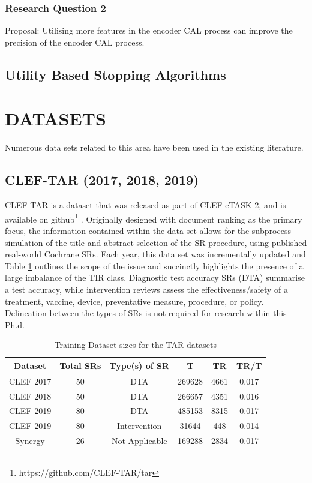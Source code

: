 \documentclass[10pt, english]{article}
\begin{document}
    \subsubsection{Research Question 2}

    Proposal: Utilising more features in the encoder CAL process can improve the precision of the encoder CAL process.

    \newpage

    \subsection{Utility Based Stopping Algorithms}


\section{DATASETS}


Numerous data sets related to this area have been used in the existing literature.

\subsection{CLEF-TAR (2017, 2018, 2019)}

CLEF-TAR is a dataset that was released as part of CLEF eTASK 2, and is available on github\footnote{https://github.com/CLEF-TAR/tar} \cite{kanoulas_clef_2017, kanoulas_clef_2018, kanoulas_clef_2019}. Originally designed with document ranking as the primary focus, the information contained within the data set allows for the subprocess simulation of the title and abstract selection of the SR procedure, using published real-world Cochrane SRs. Each year, this data set was incrementally updated and Table \ref{tab:training_dataset_clef} outlines the scope of the issue and succinctly highlights the presence of a large imbalance of the TIR class. Diagnostic test accuracy SRs (DTA) summarise a test accuracy, while intervention reviews assess the effectiveness/safety of a treatment, vaccine, device, preventative measure, procedure, or policy. Delineation between the types of SRs is not required for research within this Ph.d.


\begin{table}
    \centering
    \begin{tabular}{|c|c|c|c|c|c|}
    \hline
        Dataset & Total SRs & Type(s) of SR & T & TR & TR/T\\   \hline
        CLEF 2017 & 50 & DTA & 269628 & 4661  & 0.017 \\   \hline
        CLEF 2018 & 50 & DTA & 266657 & 4351 & 0.016\\   \hline
             CLEF   2019 & 80 & DTA & 485153 & 8315 & 0.017\\   \hline
               CLEF  2019 & 80 & Intervention & 31644 &  448 & 0.014 \\   \hline
Synergy & 26 & Not Applicable & 169288 &  2834 & 0.017 \\   \hline
    \end{tabular}
    \caption{Training Dataset sizes for the TAR datasets}
    \label{tab:training_dataset_clef}
\end{table}
\end{document}
